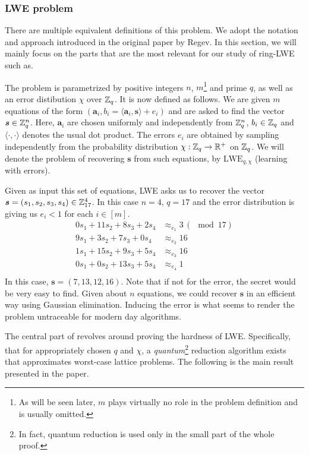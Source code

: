 \subsubsection*{LWE problem}
There are multiple equivalent definitions of this problem. We adopt the notation and approach introduced in the original paper by Regev. In this section, we will mainly focus on the parts that are the most relevant for our study of ring-LWE such as. 

The problem is parametrized by positive integers $n$, $m$\footnote{As will be seen later, $m$ plays virtually no role in the problem definition and is usually omitted.} and prime $q$, as well as an error distibution $\chi$ over $\mathbb{Z}_q$. It is now defined as follows. We are given $m$ equations of the form $(\bm{a}_i, b_i = \langle \bm{a}_i, \bm{s} \rangle + e_i)$ and are asked to find the vector $\boldsymbol{s} \in \mathbb{Z}_q^n$. Here, $\bm{a}_i$ are chosen uniformly and independently from $\mathbb{Z}_q^n$, $b_i \in \mathbb{Z}_q$ and $\langle \cdot, \cdot \rangle$ denotes the usual dot product. The errors $e_i$ are obtained by sampling independently from the probability distribution $\chi : \mathbb{Z}_q \rightarrow \mathbb{R}^{+}$ on $\mathbb{Z}_q$. We will denote the problem of recovering $\bm{s}$ from such equations, by $\text{LWE}_{q, \chi}$ (learning with errors).

\begin{example}\label{lwe_ex}
	Given as input this set of equations, LWE asks us to recover the vector $\boldsymbol{s} = (s_1, s_2, s_3, s_4) \in \mathbb{Z}_{17}^4$. In this case $n = 4$, $q=17$ and the error distribution is giving us $e_i < 1$ for each $i \in [m]$. 
\begin{align*}
	0s_1 + 11s_2 +8s_3 + 2s_4 & \approx_{e_1} 3 \, (\mod 17)\\
	9s_1 +  3s_2 + 7s_3 + 0s_4 & \approx_{e_2} 16 \\
	1s_1 +  15s_2 + 9s_3 + 5s_4 & \approx_{e_3} 16 \\
	0s_1 +  0s_2 + 13s_3 + 5s_4 & \approx_{e_4} 1\\
\end{align*}
In this case, $\bm{s} = (7, 13, 12, 16)$. Note that if not for the error, the secret would be very easy to find. Given about $n$ equations, we could recover $\bm{s}$ in an efficient way using Gaussian elimination. Inducing the error is what seems to render the problem untraceable for modern day algorithms.
\end{example}
The central part of \cite{regev} revolves around proving the hardness of LWE. Specifically, that for appropriately chosen $q$ and $\chi$, a \textit{quantum}\footnote{In fact, quantum reduction is used only in the small part of the whole proof.} reduction algorithm exists that approximates worst-case lattice problems. The following is the main result presented in the paper. 

